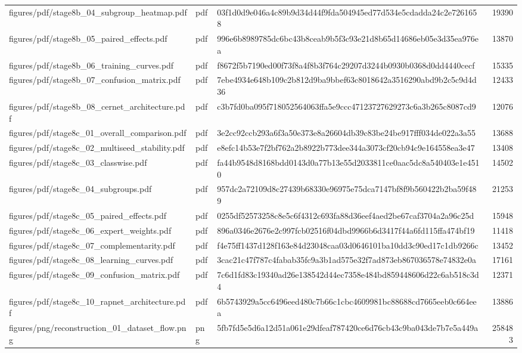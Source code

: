 \begin{tabular}{lllr}
figures/pdf/stage8b_04_subgroup_heatmap.pdf & pdf & 03f1d0d9e046a4c89b9d34d44f9fda504945ed77d534e5cdadda24c2e7261658 & 19390 \\
figures/pdf/stage8b_05_paired_effects.pdf & pdf & 996e6b8989785dc6bc43b8ceab9b5f3c93e21d8b65d14686eb05e3d35ea976ea & 13870 \\
figures/pdf/stage8b_06_training_curves.pdf & pdf & f8672f5b7190ed00f73f8a4f8b3f764c29207d3244b0930b0368d0dd4440cecf & 15335 \\
figures/pdf/stage8b_07_confusion_matrix.pdf & pdf & 7ebe4934e648b109c2b812d9ba9bbef63c8018642a3516290abd9b2c5c9d4d36 & 12433 \\
figures/pdf/stage8b_08_cernet_architecture.pdf & pdf & c3b7fd0ba095f718052564063ffa5e9ccc47123727629273c6a3b265c8087cd9 & 12076 \\
figures/pdf/stage8c_01_overall_comparison.pdf & pdf & 3e2cc92ccb293a6f3a50e373e8a26604db39c83be24be917fff034de022a3a55 & 13688 \\
figures/pdf/stage8c_02_multiseed_stability.pdf & pdf & e8efc14b53e7f2bf762a2b8922b773dee344a3073cf20cb94c9e164558ea3e47 & 13408 \\
figures/pdf/stage8c_03_classwise.pdf & pdf & fa44b9548d8168bdd0143d0a77b13e55d2033811ce0aac5dc8a540403e1e4510 & 14502 \\
figures/pdf/stage8c_04_subgroups.pdf & pdf & 957dc2a72109d8c27439b68330e96975e75dca7147bf8f9b560422b2ba59f489 & 21253 \\
figures/pdf/stage8c_05_paired_effects.pdf & pdf & 0255df52573258c8e5c6f4312c693fa88d36eef4aed2be67caf3704a2a96c25d & 15948 \\
figures/pdf/stage8c_06_expert_weights.pdf & pdf & 896a0346e2676e2c997fcb02516f04dbd9966b6d3417f44a6fd115ffa474bf19 & 11418 \\
figures/pdf/stage8c_07_complementarity.pdf & pdf & f4e75ff1437d128f163e84d23048caa03d0646101ba10dd3c90ed17c1db9266c & 13452 \\
figures/pdf/stage8c_08_learning_curves.pdf & pdf & 3cac21c47f787c4fabab35fc9a3b1ad575e32f7ad873eb867036578e74832e0a & 17161 \\
figures/pdf/stage8c_09_confusion_matrix.pdf & pdf & 7c6d1fd83c19340ad26e138542d44ec7358e484bd859448606d22c6ab518c3d4 & 12371 \\
figures/pdf/stage8c_10_rapnet_architecture.pdf & pdf & 6b5743929a5cc6496eed480c7b66c1cbc4609981bc88688cd7665eeb0c664eea & 13886 \\
figures/png/reconstruction_01_dataset_flow.png & png & 5fb7fd5e5d6a12d51a061e29dfeaf787420ce6d76cb43c9ba043de7b7e5a449a & 258483 \\

\end{tabular}
